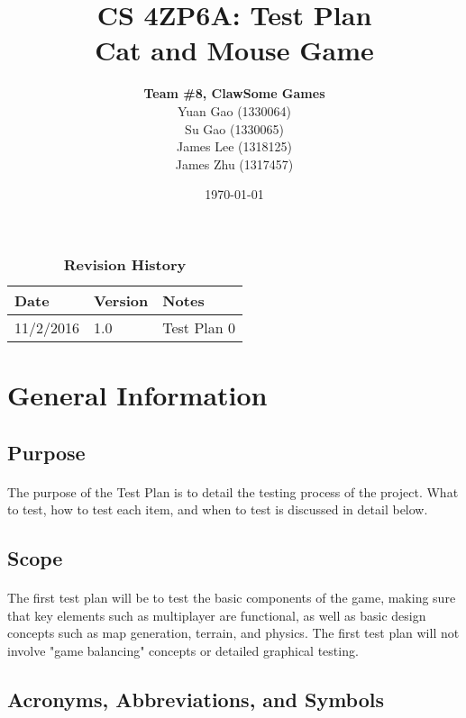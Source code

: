 \documentclass[12pt, titlepage]{article}
\title{CS 4ZP6A: Test Plan\\Cat and Mouse Game}
\author{\textbf{Team \#8, ClawSome Games}
		\\ Yuan Gao (1330064)
		\\ Su Gao (1330065)
		\\ James Lee (1318125)
		\\ James Zhu (1317457) 
}
\date{\today}
\begin{document}
\maketitle
{}
\tableofcontents
\listoftables
\listoffigures
\begin{table}[bp]
\caption{\bf Revision History}
\begin{tabularx}{\textwidth}{p{3cm}p{2cm}X}
\toprule {\bf Date} & {\bf Version} & {\bf Notes}\\
\midrule
11/2/2016 & 1.0 & Test Plan 0\\
\bottomrule
\end{tabularx}
\end{table}
\newpage
{}
\section{General Information}
\subsection{Purpose}
\paragraph{}The purpose of the Test Plan is to detail the testing process of the project. What to test, how to test each item, and when to test is discussed in detail below. 
\subsection{Scope}
\paragraph{}The first test plan will be to test the basic components of the game, making sure that key elements such as multiplayer are functional, as well as basic design concepts such as map generation, terrain, and physics. The first test plan will not involve "game balancing" concepts or detailed graphical testing. 
\subsection{Acronyms, Abbreviations, and Symbols}
	
\end{document}
